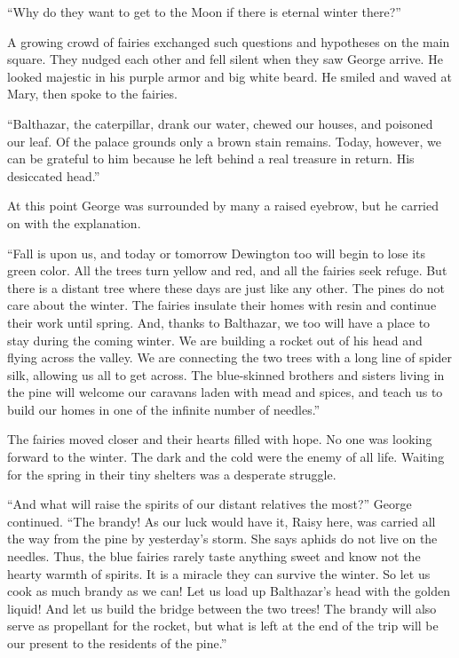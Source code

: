 \documentclass[10pt, draft]{memoir}
\begin{document}
``Why do they want to get to the Moon if there is eternal winter there?''

A growing crowd of fairies exchanged such questions and hypotheses on the main
square. They nudged each other and fell silent when they saw George arrive. He
looked majestic in his purple armor and big white beard. He smiled and waved at
Mary, then spoke to the fairies.

``Balthazar, the caterpillar, drank our water, chewed our houses, and poisoned
our leaf. Of the palace grounds only a brown stain remains. Today, however, we
can be grateful to him because he left behind a real treasure in return. His
desiccated head.''

At this point George was surrounded by many a raised eyebrow, but he carried on
with the explanation.

``Fall is upon us, and today or tomorrow Dewington too will begin to lose its
green color. All the trees turn yellow and red, and all the fairies seek
refuge. But there is a distant tree where these days are just like any other.
The pines do not care about the winter. The fairies insulate their homes with
resin and continue their work until spring. And, thanks to Balthazar, we too
will have a place to stay during the coming winter. We are building a rocket
out of his head and flying across the valley. We are connecting the two trees
with a long line of spider silk, allowing us all to get across. The
blue-skinned brothers and sisters living in the pine will welcome our caravans
laden with mead and spices, and teach us to build our homes in one of the
infinite number of needles.''

The fairies moved closer and their hearts filled with hope. No one was looking
forward to the winter. The dark and the cold were the enemy of all life.
Waiting for the spring in their tiny shelters was a desperate struggle.

``And what will raise the spirits of our distant relatives the most?'' George
continued. ``The brandy! As our luck would have it, Raisy here, was carried all
the way from the pine by yesterday's storm. She says aphids do not live on the
needles. Thus, the blue fairies rarely taste anything sweet and know not the
hearty warmth of spirits. It is a miracle they can survive the winter. So let
us cook as much brandy as we can! Let us load up Balthazar's head with the
golden liquid! And let us build the bridge between the two trees! The brandy
will also serve as propellant for the rocket, but what is left at the end of
the trip will be our present to the residents of the pine.''
\end{document}

